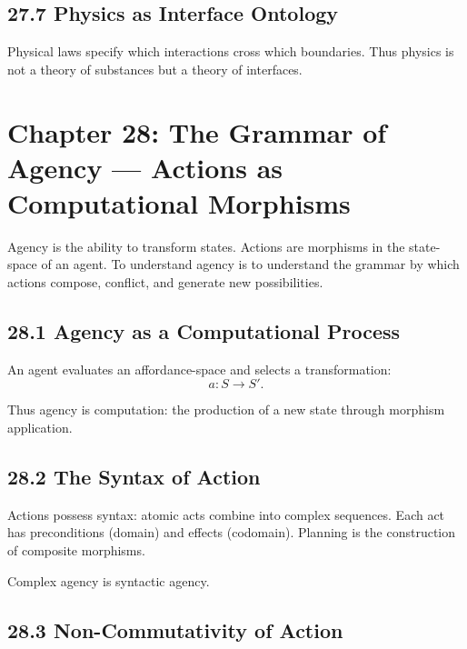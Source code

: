 \documentclass[12pt,letterpaper]{article}
\theoremstyle{remark}
\begin{document}
\subsection{27.7 Physics as Interface Ontology}

Physical laws specify which interactions cross which boundaries. Thus physics is not a theory of substances but a theory of interfaces.

\newpage

\section{Chapter 28: The Grammar of Agency — Actions as Computational Morphisms}

Agency is the ability to transform states. Actions are morphisms in the state-space of an agent. To understand agency is to understand the grammar by which actions compose, conflict, and generate new possibilities.

\subsection{28.1 Agency as a Computational Process}

An agent evaluates an affordance-space and selects a transformation:
\[
a: S \to S'.
\]

Thus agency is computation: the production of a new state through morphism application.

\subsection{28.2 The Syntax of Action}

Actions possess syntax: atomic acts combine into complex sequences. Each act has preconditions (domain) and effects (codomain). Planning is the construction of composite morphisms.

Complex agency is syntactic agency.

\subsection{28.3 Non-Commutativity of Action}
\end{document}
